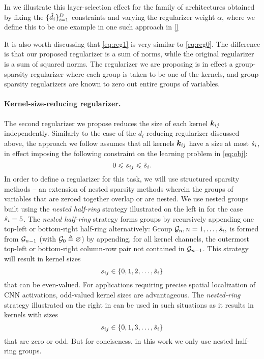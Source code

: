 

In  we illustrate this layer-selection effect for the family of architectures obtained by fixing the $\{\hat{d}_i\}_{i=1}^D$ constraints and varying the regularizer weight $\alpha$, where we define this to be one example in one such approach in \eqref{}%

It is also worth discussing that \eqref{eq:reg1} is very similar to \eqref{eq:reg0}. The difference is that our proposed regularizer is a sum of norms, while the original regularizer is a sum of squared norms. The regularizer we are proposing is in effect a group-sparsity regularizer \cite{CB2} where each group is taken to be one of the kernels, and group sparsity regularizers are known to zero out entire groups of variables. %


\paragraph{Kernel-size-reducing regularizer.} The second regularizer we propose reduces the size of each kernel $\bm{k}_{ij}$ independently. Similarly to the case of the $d_i$-reducing regularizer discussed above, the approach we follow assumes that all kernels $\bm{k}_{ij}$ have a size at most $\hat{s}_i$, in effect imposing the following constraint on the learning problem in \eqref{eq:obj}:
\begin{equation}
  0 \leqslant s_{ij} \leqslant \hat{s}_i.
\end{equation}
In order to define a regularizer for this task, we will use structured sparsity methods -- an extension of nested sparsity methods wherein the groups of variables that are zeroed together overlap or are nested. We use nested groups built using the \emph{nested half-ring} strategy illustrated on the left in  for the case $\hat{s}_i=5$. The \emph{nested half-ring} strategy forms groups by recursively appending one top-left or bottom-right half-ring alternatively: Group $\mathcal{G}_n, n=1,\ldots,\hat{s}_i,$  is formed from $\mathcal{G}_{n-1}$ (with $\mathcal{G}_0 \triangleq \varnothing$) by appending, for all kernel channels, the outermost top-left or bottom-right column-row pair not contained in $\mathcal{G}_{n-1}$. This strategy will result in kernel sizes
\begin{equation}
s_{ij} \in \{0,1,2, \ldots, \hat{s}_i\}
\end{equation}
that can be even-valued. For applications requiring precise spatial localization of CNN activations, odd-valued kernel sizes are advantageous. The \emph{nested-ring} strategy illustrated on the right in  can be used in such situations as it results in kernels with sizes
\begin{equation}
s_{ij} \in \{0,1,3,\ldots,\hat{s}_i\}
\end{equation}
that are zero or odd. But for conciseness, in this work we only use nested half-ring groups.

